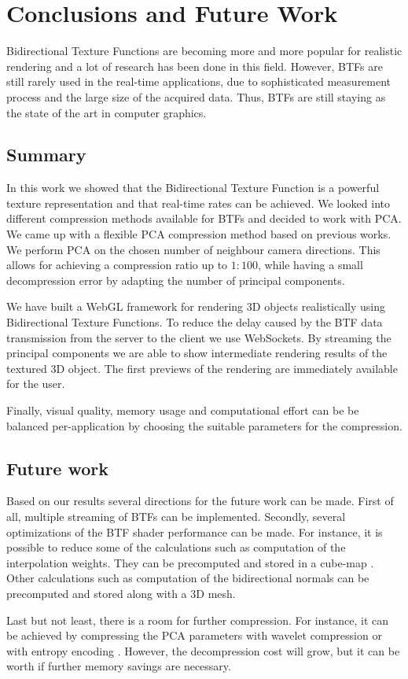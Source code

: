 \chapter{Conclusions and Future Work}
\label{chapter:conclusions}
 Bidirectional Texture Functions are becoming more and more popular for realistic rendering
and a lot of research has been done in this field. 
However, BTFs are still rarely used in the real-time applications, 
due to sophisticated measurement process and the large size of the acquired data.
Thus, BTFs are still staying as the state of the art in computer graphics. 


\section{Summary}
In this work we showed that the Bidirectional Texture Function is a powerful texture representation and 
that real-time rates can be achieved.
We looked into different compression methods available for BTFs and decided to work with PCA.
We came up with a flexible PCA compression method based on previous works.
We perform PCA on the chosen number of neighbour camera directions.
This allows for achieving a compression ratio up to $1:100$, while having a small decompression error by adapting the number of principal components.

We have built a WebGL framework for rendering 3D objects realistically using Bidirectional Texture Functions.
To reduce the delay caused by the BTF data transmission from the server to the client we use WebSockets.
By streaming the principal components we are able to show intermediate rendering results of the textured 3D object.
The first previews of the rendering are immediately available for the user.

Finally, visual quality, memory usage and computational effort can be be balanced  per-application by choosing the suitable parameters for the compression.


\section{Future work}
\label{section:future_work}

Based on our results several directions for the future work can be made.
First of all, multiple streaming of BTFs can be implemented.
Secondly, several optimizations of the BTF shader performance can be made.
For instance, it is possible to reduce some of the calculations such as computation of the interpolation weights. 
They can be precomputed and stored in a cube-map \cite{haindl}.
Other calculations such as computation of the bidirectional normals can be precomputed and stored along with a 3D mesh.

Last but not least, there is a room for further compression.
 For instance, it can be achieved by compressing the PCA parameters with wavelet compression \cite{webglbtfstreaming} or with entropy encoding \cite{gpu_gems}. 
However, the decompression cost will grow, but it can be worth if further memory savings are necessary. 